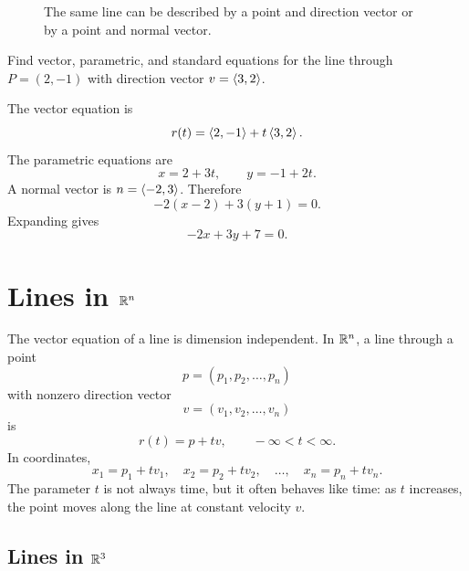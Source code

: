 \begin{figure}[H]
\centering
{}
\caption{The same line can be described by a point and direction vector or by a point and normal vector.}
\end{figure}

\begin{examplebox}[title={Example 4.1: Same line, three descriptions}]
Find vector, parametric, and standard equations for the line through $P=(2,-1)$ with direction vector $v=\left\langle 3,2\right\rangle$.

The vector equation is
\[
  r(t)=\left\langle 2,-1\right\rangle+t\left\langle 3,2\right\rangle.
\]
The parametric equations are
\[
  x=2+3t,\qquad y=-1+2t.
\]
A normal vector is $n=\left\langle -2,3\right\rangle$. Therefore
\[
  -2(x-2)+3(y+1)=0.
\]
Expanding gives
\[
  -2x+3y+7=0.
\]
\end{examplebox}

\section{Lines in $\mathbb{R}^n$}

The vector equation of a line is dimension independent. In $\mathbb{R}^n$, a line through a point
\[
  p=(p_1,p_2,\ldots,p_n)
\]
with nonzero direction vector
\[
  v=(v_1,v_2,\ldots,v_n)
\]
is
\[
  r(t)=p+tv,\qquad -\infty<t<\infty.
\]
In coordinates,
\[
  x_1=p_1+tv_1,\quad x_2=p_2+tv_2,\quad \ldots,\quad x_n=p_n+tv_n.
\]
The parameter $t$ is not always time, but it often behaves like time: as $t$ increases, the point moves along the line at constant velocity $v$.

\subsection{Lines in $\mathbb{R}^3$}

